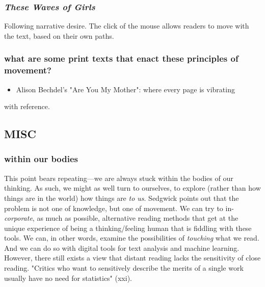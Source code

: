 \documentclass[11pt]{article}
\begin{document}
\subsubsection{\emph{These Waves of Girls}}
\label{sec:org91edde3}
Following narrative desire. The click of the mouse allows readers to
move with the text, based on their own paths. 

\subsubsection{what are some print texts that enact these principles of movement?}
\label{sec:org76570d6}
\begin{itemize}
\item Alison Bechdel's "Are You My Mother": where every page is vibrating
\end{itemize}
with reference. 


\subsection{MISC}
\label{sec:orgcd3ee91}



\subsubsection{within our bodies}
\label{sec:org77846e9}
This point bears repeating---we are always stuck within the bodies of
our thinking. As such, we might as well turn to ourselves, to explore
(rather than how things are in the world) how things are \emph{to
us}. Sedgwick points out that the problem is not one of knowledge, but
one of movement. We can try to in-\emph{corporate}, as much as possible,
alternative reading methods that get at the unique experience of being
a thinking/feeling human that is fiddling with these tools. We can, in
other words, examine the possibilities of \emph{touching} what we read. And
we can do so with digital tools for text analysis and machine
learning.  However, there still exists a view that distant reading
lacks the sensitivity of close reading. "Critics who want to
sensitively describe the merits of a single work usually have no need
for statistics" (xxi).
\end{document}
